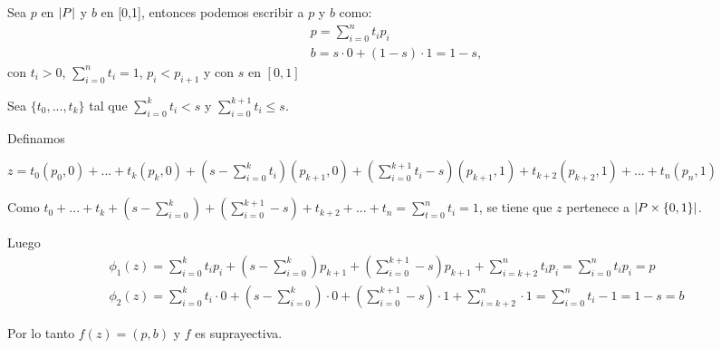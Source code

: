 \begin{Dem}
Sea $p$ en $\left| P \right|$ y $b$ en [0,1], entonces podemos escribir a $p$ y $b$ como:
\begin{eqnarray}
p = \sum_{i=0}^{n}t_ip_i \\
b = s\cdot 0 + (1-s)\cdot 1 = 1-s, 
\end{eqnarray}
con $t_i>0$, $\sum_{i=0}^{n}t_i =1$, $p_i<p_{i+1}$ y con $s$ en $[0,1]$

Sea $\{t_0,...,t_k\} $ tal que $\sum_{i=0}^{k}t_i <s$ y $\sum_{i=0}^{k+1}t_i\leq s$.

Definamos

$z =t_0(p_0,0)+ ...+ t_k(p_k,0)+(s-\sum_{i=0}^{k}t_i)(p_{k+1},0)+(\sum_{i=0}^{k+1}t_i-s)(p_{k+1},1)+t_{k+2}(p_{k+2},1)+...+t_n(p_n,1)$ 

Como $t_0 +...+t_k+(s-\sum_{i=0}^{k})+(\sum_{i=0}^{k+1}-s)+t_{k+2}+...+t_n = \sum_{t=0}^{n}t_i = 1$, se tiene que $z$ pertenece a $\left| P\times\{0,1\} \right|$.

Luego
\begin{eqnarray*}
\phi_1(z) = \sum_{i=0}^{k}t_ip_i + (s-\sum_{i=0}^{k})p_{k+1} +(\sum_{i=0}^{k+1}-s)p_{k+1} + \sum_{i = k+2}^{n}t_ip_i = \sum_{i=0}^{n}t_ip_i = p\\
\phi_2(z) = \sum_{i=0}^{k}t_i\cdot 0 + (s-\sum_{i=0}^{k})\cdot 0 +(\sum_{i=0}^{k+1}-s)\cdot 1 + \sum_{i = k+2}^{n}\cdot 1 = \sum_{i=0}^{n}t_i -1 = 1-s = b
\end{eqnarray*}

Por lo tanto $f(z)=(p,b)$ y $f$ es suprayectiva.
\end{Dem}

